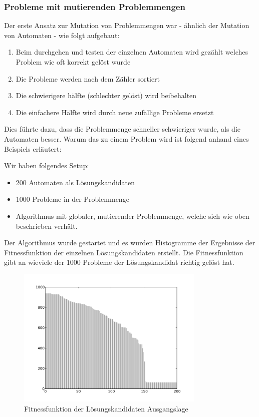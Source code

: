 \subsubsection{Probleme mit mutierenden Problemmengen}
Der erste Ansatz zur Mutation von Problemmengen war - ähnlich der Mutation von Automaten - wie folgt aufgebaut:
\begin{enumerate}
  \item Beim durchgehen und testen der einzelnen Automaten wird gezählt welches Problem wie oft korrekt gelöst wurde
  \item Die Probleme werden nach dem Zähler sortiert 
  \item Die schwierigere hälfte (schlechter gelöst) wird beibehalten
  \item Die einfachere Hälfte wird durch neue zufällige Probleme ersetzt
\end{enumerate}

Dies führte dazu, dass die Problemmenge schneller schwieriger wurde, als die Automaten besser. Warum das zu einem Problem wird ist folgend anhand eines Beispiels erläutert:

Wir haben folgendes Setup:
\begin{itemize}
  \item 200 Automaten als Lösungskandidaten
  \item 1000 Probleme in der Problemmenge
  \item Algorithmus mit globaler, mutierender Problemmenge, welche sich wie oben beschrieben verhält.
\end{itemize}

Der Algorithmus wurde gestartet und es wurden Histogramme der Ergebnisse der Fitnessfunktion der einzelnen Lösungskandidaten erstellt. Die Fitnessfunktion gibt an wieviele der 1000 Probleme der Lösungskandidat richtig gelöst hat.

\begin{figure}[h]
  \centering
  \includegraphics[width=0.8\textwidth]{./images/before_mutation.pdf}
  \caption[Fitnessfunktion der Lösungskandidaten Ausgangslage]{Fitnessfunktion der Lösungskandidaten Ausgangslage}
\end{figure}

